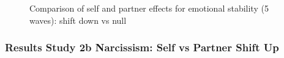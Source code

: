 \documentclass[
  singlecolumn]{article}
\begin{document}
\begin{figure}


\caption{\label{fig-results-emotional-stability-self-partner-down-long-comparison}Comparison
of self and partner effects for emotional stability (5 waves): shift
down vs null}

\end{figure}%

\newpage{}

\subsubsection{Results Study 2b Narcissism: Self vs Partner Shift
Up}\label{results-study-2b-narcissism-self-vs-partner-shift-up}
\end{document}

